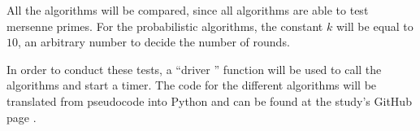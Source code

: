 \documentclass[main.tex]{subfiles}
\begin{document}
All the algorithms will be compared, since all algorithms are able to test
mersenne primes. For the probabilistic algorithms, the constant $k$ will be equal to
$10$, an arbitrary number to decide the number of rounds. \newline

In order to conduct these tests, a ``driver '' function will be used to call the
algorithms and start a timer. The code for the different algorithms will be
translated from pseudocode into Python and can be found at the study's GitHub
page \cite{github}.
\end{document}
